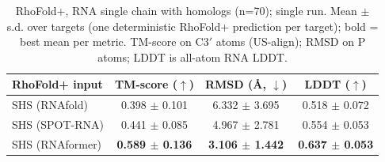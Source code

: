 \begin{table}[htbp]
\centering
\caption{RhoFold+, RNA single chain with homologs (n=70); single run. Mean $\pm$ s.d. over targets (one deterministic RhoFold+ prediction per target); bold = best mean per metric. TM-score on C3$'$ atoms (US-align); RMSD on P atoms; LDDT is all-atom RNA LDDT.}
\label{tab:rf_rna_single_chain_with_homologs}
\begin{tabular}{lccc}
\toprule
RhoFold+ input & TM-score ($\uparrow$) & RMSD (\AA, $\downarrow$) & LDDT ($\uparrow$) \\
\midrule
SHS (RNAfold) & 0.398 $\pm$ 0.101 & 6.332 $\pm$ 3.695 & 0.518 $\pm$ 0.072 \\
SHS (SPOT-RNA) & 0.441 $\pm$ 0.085 & 4.967 $\pm$ 2.781 & 0.554 $\pm$ 0.053 \\
SHS (RNAformer) & \textbf{0.589 $\pm$ 0.136} & \textbf{3.106 $\pm$ 1.442} & \textbf{0.637 $\pm$ 0.053} \\
\bottomrule
\end{tabular}
\end{table}
